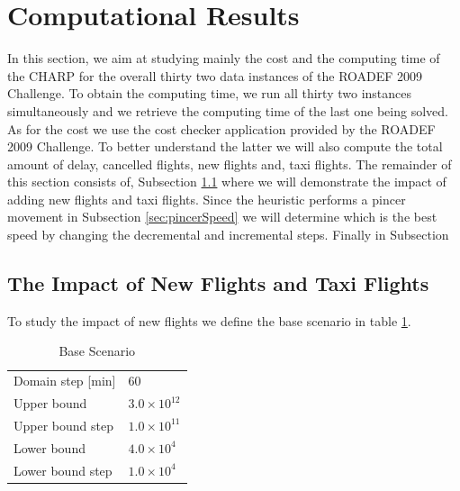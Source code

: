 \section{Computational Results}\label{sec:compResults}

In this section, we aim at studying mainly the cost and the computing time of the CHARP for the overall thirty two data instances of the ROADEF 2009 Challenge. To obtain the computing time, we run all thirty two instances simultaneously and we retrieve the computing time of the last one being solved. As for the cost we use the cost checker application provided by the ROADEF 2009 Challenge. To better understand the latter we will also compute the total amount of delay, cancelled flights, new flights and, taxi flights. The remainder of this section consists of, Subsection \ref{sec:impact} where we will demonstrate the impact of adding new flights and taxi flights. Since the heuristic performs a pincer movement in Subsection \ref{sec:pincerSpeed} we will determine which is the best speed by changing the decremental and incremental steps. Finally in Subsection \\
 
\subsection{The Impact of New Flights and Taxi Flights}\label{sec:impact}
To study the impact of new flights we define the base scenario in table \ref{tbl:baseScenario}. 

	\begin{table}[h!]
		\centering
		\caption{Base Scenario}
		\label{tbl:baseScenario}
		\begin{tabular}{ll}
			\hline
			Domain step {[}min{]} & 60                           \\
			Upper bound           & $3.0 \times 10^{12}$ \\
			Upper bound step      & $1.0 \times 10^{11}$ \\
			Lower bound           & $4.0 \times 10^4$ \\
			Lower bound step      & $1.0 \times 10^4$ \\
			\hline
		\end{tabular}
	\end{table}


